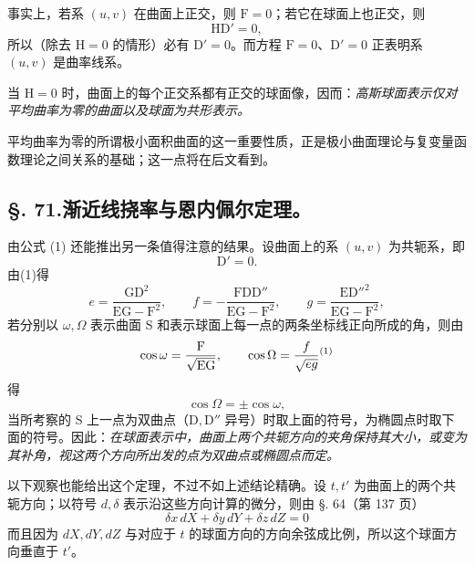 事实上，若系 \((u,v)\) 在曲面上正交，则 \(\mathrm F=0\)；若它在球面上也正交，则
\[
 \mathrm H\mathrm D'=0,
\]
所以（除去 \(\mathrm H=0\) 的情形）必有 \(\mathrm D'=0\)。而方程 \(\mathrm F=0\)、\(\mathrm D'=0\) 正表明系 \((u,v)\) 是曲率线系。

当 \(\mathrm H=0\) 时，曲面上的每个正交系都有正交的球面像，因而：\emph{高斯球面表示仅对平均曲率为零的曲面以及球面为共形表示。}

平均曲率为零的所谓极小面积曲面的这一重要性质，正是极小曲面理论与复变量函数理论之间关系的基础；这一点将在后文看到。


\subsection*{\S. 71.\quad 渐近线挠率与恩内佩尔定理。}

由公式 (1) 还能推出另一条值得注意的结果。设曲面上的系 \((u,v)\) 为共轭系，即
\[
 \mathrm D'=0.
\]
由(1)得
\[
 e=\frac{\mathrm G\mathrm D^2}{\mathrm E\mathrm G-\mathrm F^2},\qquad
 f=-\frac{\mathrm F\mathrm D\mathrm D''}{\mathrm E\mathrm G-\mathrm F^2},\qquad
 g=\frac{\mathrm E\mathrm D''^2}{\mathrm E\mathrm G-\mathrm F^2},
\]
若分别以 \(\omega,\Omega\) 表示曲面 S 和表示球面上每一点的两条坐标线正向所成的角，则由
\[
 \cos\omega=\frac{\mathrm F}{\sqrt{\mathrm E\mathrm G}},\qquad
 \cos\Omega=\frac{f}{\sqrt{e g}}\srcfnmark{1}
\]
得
\[
 \cos\Omega=\pm\cos\omega,
\]
当所考察的 S 上一点为双曲点（\(\mathrm D,\mathrm D''\) 异号）时取上面的符号，为椭圆点时取下面的符号。因此：\emph{在球面表示中，曲面上两个共轭方向的夹角保持其大小，或变为其补角，视这两个方向所出发的点为双曲点或椭圆点而定。}

以下观察也能给出这个定理，不过不如上述结论精确。设 \(t,t'\) 为曲面上的两个共轭方向；以符号 \(d,\delta\) 表示沿这些方向计算的微分，则由 \S. 64（第 137 页）
\[
 \delta x\,dX+\delta y\,dY+\delta z\,dZ=0
\]
而且因为 \(dX,dY,dZ\) 与对应于 \(t\) 的球面方向的方向余弦成比例，所以这个球面方向垂直于 \(t'\)。

